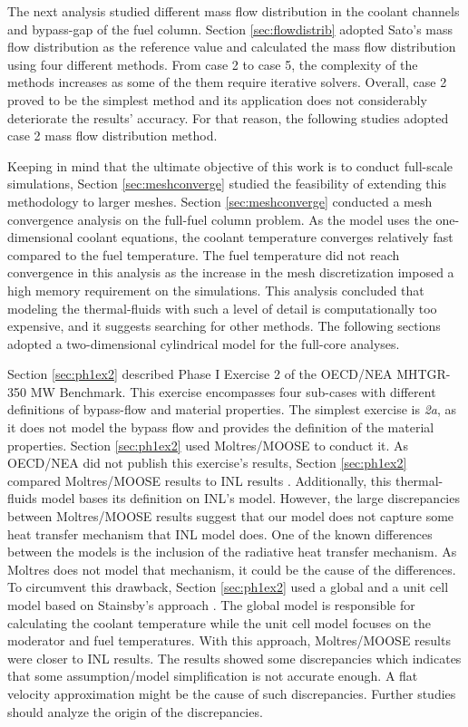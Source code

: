 The next analysis studied different mass flow distribution in the coolant channels and bypass-gap of the fuel column.
Section \ref{sec:flowdistrib} adopted Sato's mass flow distribution as the reference value and calculated the mass flow distribution using four different methods.
From case 2 to case 5, the complexity of the methods increases as some of the them require iterative solvers.
Overall, case 2 proved to be the simplest method and its application does not considerably deteriorate the results' accuracy.
For that reason, the following studies adopted case 2 mass flow distribution method.

Keeping in mind that the ultimate objective of this work is to conduct full-scale simulations, Section \ref{sec:meshconverge} studied the feasibility of extending this methodology to larger meshes.
Section \ref{sec:meshconverge} conducted a mesh convergence analysis on the full-fuel column problem.
As the model uses the one-dimensional coolant equations, the coolant temperature converges relatively fast compared to the fuel temperature.
The fuel temperature did not reach convergence in this analysis as the increase in the mesh discretization imposed a high memory requirement on the simulations.
This analysis concluded that modeling the thermal-fluids with such a level of detail is computationally too expensive, and it suggests searching for other methods.
The following sections adopted a two-dimensional cylindrical model for the full-core analyses.

Section \ref{sec:ph1ex2} described Phase I Exercise 2 of the OECD/NEA MHTGR-350 MW Benchmark.
This exercise encompasses four sub-cases with different definitions of bypass-flow and material properties.
The simplest exercise is \textit{2a}, as it does not model the bypass flow and provides the definition of the material properties.
Section \ref{sec:ph1ex2} used Moltres/MOOSE to conduct it.
As OECD/NEA did not publish this exercise’s results, Section \ref{sec:ph1ex2} compared Moltres/MOOSE results to INL results \cite{strydom_inl_2013}.
Additionally, this thermal-fluids model bases its definition on INL's model.
However, the large discrepancies between Moltres/MOOSE results suggest that our model does not capture some heat transfer mechanism that INL model does.
One of the known differences between the models is the inclusion of the radiative heat transfer mechanism.
As Moltres does not model that mechanism, it could be the cause of the differences.
To circumvent this drawback, Section \ref{sec:ph1ex2} used a global and a unit cell model based on Stainsby's approach \cite{stainsby_investigation_2008}.
The global model is responsible for calculating the coolant temperature while the unit cell model focuses on the moderator and fuel temperatures.
With this approach, Moltres/MOOSE results were closer to INL results.
The results showed some discrepancies which indicates that some assumption/model simplification is not accurate enough.
A flat velocity approximation might be the cause of such discrepancies.
Further studies should analyze the origin of the discrepancies.

